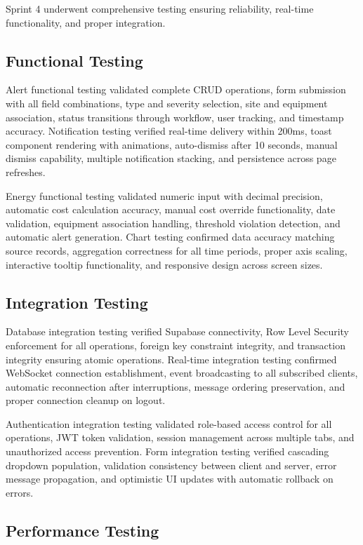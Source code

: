 Sprint 4 underwent comprehensive testing ensuring reliability, real-time functionality, and proper integration.

\subsection{Functional Testing}

Alert functional testing validated complete CRUD operations, form submission with all field combinations, type and severity selection, site and equipment association, status transitions through workflow, user tracking, and timestamp accuracy. Notification testing verified real-time delivery within 200ms, toast component rendering with animations, auto-dismiss after 10 seconds, manual dismiss capability, multiple notification stacking, and persistence across page refreshes.

Energy functional testing validated numeric input with decimal precision, automatic cost calculation accuracy, manual cost override functionality, date validation, equipment association handling, threshold violation detection, and automatic alert generation. Chart testing confirmed data accuracy matching source records, aggregation correctness for all time periods, proper axis scaling, interactive tooltip functionality, and responsive design across screen sizes.

\subsection{Integration Testing}

Database integration testing verified Supabase connectivity, Row Level Security enforcement for all operations, foreign key constraint integrity, and transaction integrity ensuring atomic operations. Real-time integration testing confirmed WebSocket connection establishment, event broadcasting to all subscribed clients, automatic reconnection after interruptions, message ordering preservation, and proper connection cleanup on logout.

Authentication integration testing validated role-based access control for all operations, JWT token validation, session management across multiple tabs, and unauthorized access prevention. Form integration testing verified cascading dropdown population, validation consistency between client and server, error message propagation, and optimistic UI updates with automatic rollback on errors.

\subsection{Performance Testing}

